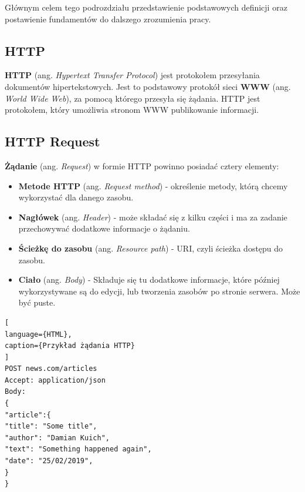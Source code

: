 \documentclass[oneside,polski,logo,indent]{amuthesis}
\begin{document}
Głównym celem tego podrozdziału przedstawienie podstawowych definicji oraz  postawienie  fundamentów do dalszego zrozumienia pracy.

\begin{center}
\subsection{HTTP}
\end{center}

\textbf{HTTP} (ang. \emph{Hypertext Transfer Protocol}) jest protokołem przesyłania dokumentów hipertekstowych. Jest to podstawowy protokół sieci \textbf{WWW} (ang. \emph{World Wide Web}), za pomocą którego przesyła się żądania. HTTP jest protokołem, który umożliwia stronom WWW publikowanie informacji.

\begin{center}
\subsection{HTTP Request}
\end{center}
\textbf{Żądanie} (ang. \emph{Request}) w formie HTTP powinno posiadać cztery elementy:

\begin{itemize}
\item \textbf{Metode HTTP} (ang. \emph{Request method}) - określenie metody, którą chcemy wykorzystać dla danego zasobu.
\item \textbf{Nagłówek} (ang. \emph{Header}) - może składać się z kilku części i ma za zadanie przechowywać dodatkowe informacje o żądaniu.
\item \textbf{Ścieżkę do zasobu} (ang. \emph{Resource path}) - URI, czyli ścieżka dostępu do zasobu.
\item \textbf{Ciało} (ang. \emph{Body}) - Składuje się tu dodatkowe informacje, które później wykorzystywane są do edycji, lub tworzenia zasobów po stronie serwera. Może być puste.
\end{itemize}



\begin{lstlisting}[
language={HTML},
caption={Przykład żądania HTTP}
]
POST news.com/articles
Accept: application/json
Body:
{
"article":{
"title": "Some title",
"author": "Damian Kuich",
"text": "Something happened again",
"date": "25/02/2019",
}
}
\end{lstlisting}
\end{document}
